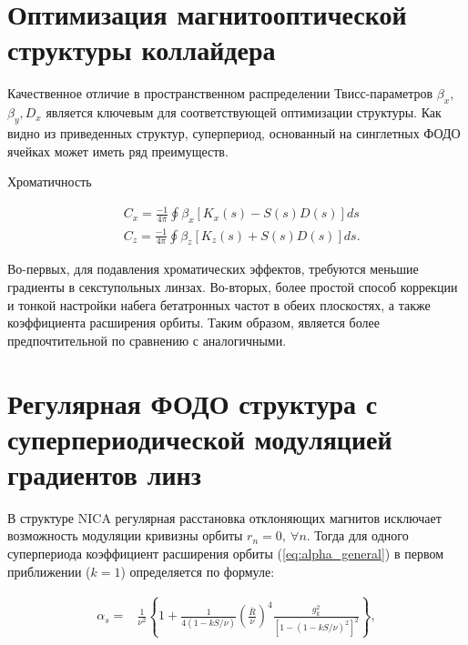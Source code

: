	\section{Оптимизация магнитооптической структуры коллайдера}\label{sec:transition_variation/methods/optimization}
\par Качественное отличие в пространственном распределении Твисс-параметров $\beta_{x}$, $\beta_{y}, D_{x}$ является ключевым для соответствующей оптимизации структуры.
Как видно из приведенных структур, суперпериод, основанный на синглетных ФОДО ячейках может иметь ряд преимуществ.

\par Хроматичность

\begin{equation}
\begin{aligned}
& C_x=\frac{-1}{4 \pi} \oint \beta_x\left[K_x(s)-S(s) D(s)\right] d s \\
& C_z=\frac{-1}{4 \pi} \oint \beta_z\left[K_z(s)+S(s) D(s)\right] d s .
\end{aligned}
\end{equation}

Во-первых, для подавления хроматических эффектов, требуются меньшие градиенты в секступольных линзах.
Во-вторых, более простой способ коррекции и тонкой настройки набега бетатронных частот в обеих плоскостях, а также коэффициента расширения орбиты.
Таким образом, является более предпочтительной по сравнению с аналогичными.


	\section{Регулярная ФОДО структура с суперпериодической модуляцией градиентов линз}\label{sec:transition_variation/methods/FODO}

\par В структуре NICA регулярная расстановка отклоняющих магнитов исключает возможность модуляции кривизны орбиты  $r_n=0, \ \forall n$. Тогда для одного суперпериода коэффициент расширения орбиты (\ref{eq:alpha_general}) в первом приближении ($k=1$) определяется по формуле:

\begin{equation}
\begin{aligned}
\alpha_s= & \frac{1}{\nu^2}\left\{1+\frac{1}{4(1-k S / \nu)}\left(\frac{\bar{R}}{\nu}\right)^4 \frac{g_k^2}{\left[1-(1-k S / \nu)^2\right]^2}\right\},
\end{aligned}
\label{eq:alpha_gradient}
\end{equation}


